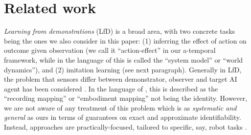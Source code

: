\documentclass[letterpaper]{article} %
\theoremstyle{definition}%
\theoremstyle{definition}
\newcommand{\todo}[1]{\textcolor{red}{#1}}
\begin{document}
\section{Related work}

%
%
%
%
%
%
%

\emph{Learning from demonstrations} (LfD) \cite{argall2009survey} is a broad area, with two concrete tasks being the ones we also consider in this paper: (1) inferring the effect of action on outcome given observation (we call it ``action-effect'' in our a-temporal framework, while in the language of \cite{argall2009survey} this is called the ``system model'' or ``world dynamics''), and (2) imitation learning (see next paragraph).
Generally in LfD, the problem that sensors differ between demonstrator, observer and target AI agent has been considered \cite{argall2009survey,ude2004programming,atkeson1997robot}.
In the language of \cite{argall2009survey}, this is described as the ``recording mapping'' or ``embodiment mapping'' not being the identity. However, we are not aware of any treatment of this problem which is as \emph{systematic and general} as ours in terms of  guarantees on exact and approximate identifiability. Instead, approaches are practically-focused, tailored to specific, say, robot tasks \cite{ude2004programming,atkeson1997robot}.




\end{document}
